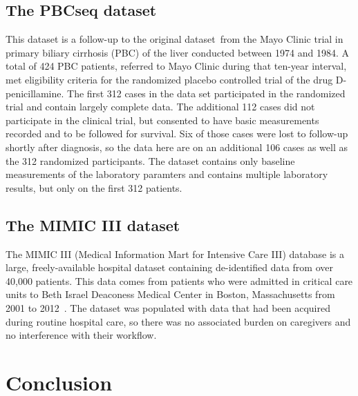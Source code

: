 \documentclass[11pt]{article}
\begin{document}
\subsection{The PBCseq dataset}

This dataset is a follow-up to the original dataset~\citep{fleming2011counting, murtaugh1994primary}from the Mayo Clinic trial in primary biliary cirrhosis (PBC) of the liver conducted between 1974 and 1984. 
A total of 424 PBC patients, referred to Mayo Clinic during that ten-year interval, met eligibility criteria for the randomized placebo controlled trial of the drug D-penicillamine. The first 312 cases in the data set participated in the randomized trial and contain largely complete data. The additional 112 cases did not participate in the clinical trial, but consented to have basic measurements recorded and to be followed for survival. Six of those cases were lost to follow-up shortly after diagnosis, so the data here are on an additional 106 cases as well as the 312 randomized participants. 
The dataset contains only baseline measurements of the laboratory paramters and contains multiple laboratory results, but only on the first 312 patients. 


\subsection{The MIMIC III dataset}

The MIMIC III (Medical Information Mart for Intensive Care III) database is a large, freely-available hospital dataset containing de-identified data from over 40,000 patients. This data comes from patients who were admitted in critical care units to Beth Israel Deaconess Medical Center in Boston, Massachusetts from 2001 to 2012~\citep{johnson2016mimic}. The dataset was populated with data that had been acquired during routine hospital care, so there was no associated burden on caregivers and no interference with their workflow.



\section{Conclusion}
\label{sec:conclusion}
\end{document}
